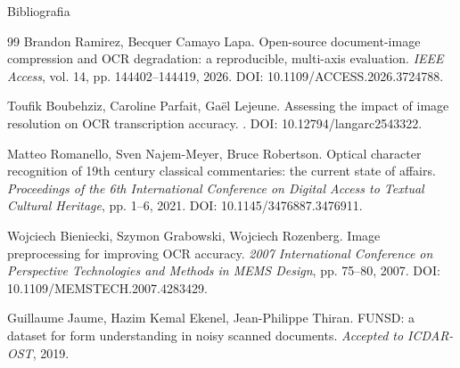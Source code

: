 \documentclass[aspectratio=169,11pt]{beamer}
\begin{document}
\begin{frame}[allowframebreaks]{Bibliografia}
\begin{thebibliography}{99}
    Brandon Ramirez, Becquer Camayo Lapa.
    \newblock Open-source document-image compression and OCR degradation: a reproducible, multi-axis evaluation.
    \newblock \emph{IEEE Access}, vol. 14, pp. 144402--144419, 2026.
    \newblock DOI: 10.1109/ACCESS.2026.3724788.

    Toufik Boubehziz, Caroline Parfait, Gaël Lejeune.
    \newblock Assessing the impact of image resolution on OCR transcription accuracy.
    .
    \newblock DOI: 10.12794/langarc2543322.

    Matteo Romanello, Sven Najem-Meyer, Bruce Robertson.
    \newblock Optical character recognition of 19th century classical commentaries: the current state of affairs.
    \newblock \emph{Proceedings of the 6th International Conference on Digital Access to Textual Cultural Heritage}, pp. 1--6, 2021.
    \newblock DOI: 10.1145/3476887.3476911.

    Wojciech Bieniecki, Szymon Grabowski, Wojciech Rozenberg.
    \newblock Image preprocessing for improving OCR accuracy.
    \newblock \emph{2007 International Conference on Perspective Technologies and Methods in MEMS Design}, pp. 75--80, 2007.
    \newblock DOI: 10.1109/MEMSTECH.2007.4283429.

    Guillaume Jaume, Hazim Kemal Ekenel, Jean-Philippe Thiran.
    \newblock FUNSD: a dataset for form understanding in noisy scanned documents.
    \newblock \emph{Accepted to ICDAR-OST}, 2019.
  \end{thebibliography}
\end{frame}
\end{document}

